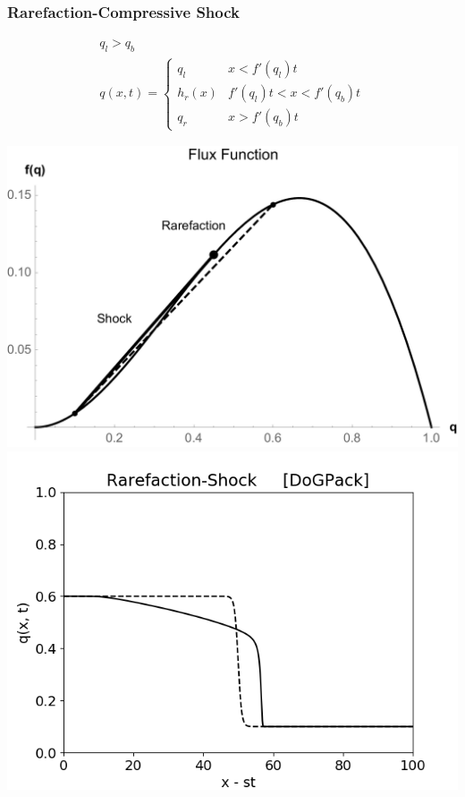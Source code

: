 \documentclass[10pt]{beamer}
\begin{document}
    \begin{frame}
      \frametitle{Rarefaction-Compressive Shock}
      \begin{gather*}
        q_l > q_b \\
        q(x, t) =
        \begin{cases}
          q_l & x < f'(q_l)t \\
          h_r(x) & f'(q_l)t < x < f'(q_b)t \\
          q_r & x > f'(q_b)t
        \end{cases}
      \end{gather*}
      \begin{center}
        \includegraphics[scale=0.2]{Figures/FluxFunctionRarefactionShock.pdf}
        \includegraphics[scale=0.3]{Figures/RarefactionShock.png}
      \end{center}
    \end{frame}
\end{document}
